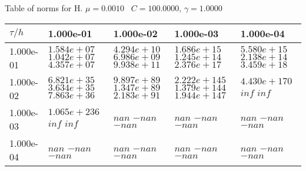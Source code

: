 \begin{center}
Table of norms for H. $\mu = 0.0010$ \, $C = 100.0000$, $\gamma = 1.0000$
  
\begin{tabular}{|p{1in}|p{1in}|p{1in}|p{1in}|p{1in}|} \hline
$\tau / h$ &1.000e-01 &1.000e-02 &1.000e-03 &1.000e-04 \\ \hline 
1.000e-01 & $1.584e+07$  $1.042e+07$  $4.357e+07$  & $4.294e+10$  $6.986e+09$  $9.938e+11$  & $1.686e+15$  $1.245e+14$  $2.376e+17$  & $5.580e+15$  $2.138e+14$  $3.459e+18$  \\ \hline 
1.000e-02 & $6.821e+35$  $3.634e+35$  $7.863e+36$  & $9.897e+89$  $1.347e+89$  $2.183e+91$  & $2.222e+145$  $1.379e+144$  $1.944e+147$  & $4.430e+170$  $inf$  $inf$  \\ \hline 
1.000e-03 & $1.065e+236$  $inf$  $inf$  & $nan$  $-nan$  $-nan$  & $nan$  $-nan$  $-nan$  & $nan$  $-nan$  $-nan$  \\ \hline 
1.000e-04 & $nan$  $-nan$  $-nan$  & $nan$  $-nan$  $-nan$  & $nan$  $-nan$  $-nan$  & $nan$  $-nan$  $-nan$  \\ \hline 

\end{tabular}\\[20pt]
\end{center}
